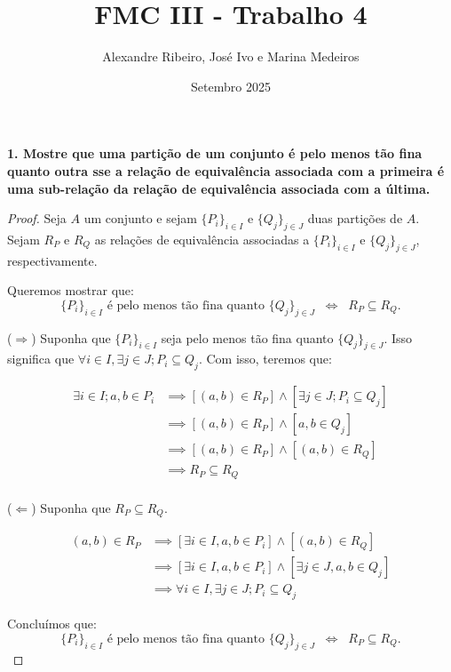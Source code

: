 \documentclass[12pt]{article}
\title{FMC III - Trabalho 4}
\author{Alexandre Ribeiro, José Ivo e Marina Medeiros}
\date{Setembro 2025}
\begin{document}
\maketitle

\textbf{1. Mostre que uma partição de um conjunto é pelo menos tão fina quanto outra sse a relação de equivalência associada com a primeira é uma sub-relação da relação de equivalência associada com a última.}

\begin{proof}
    Seja $A$ um conjunto e sejam $\{P_i\}_{i \in I}$ e $\{Q_j\}_{j \in J}$ duas partições de $A$.  
    Sejam $R_P$ e $R_Q$ as relações de equivalência associadas a $\{P_i\}_{i \in I}$ e $\{Q_j\}_{j \in J}$, respectivamente.

    \medskip
    Queremos mostrar que:
    \[
        \{P_i\}_{i \in I} \text{ é pelo menos tão fina quanto } \{Q_j\}_{j \in J}
        \;\;\Longleftrightarrow\;\;
        R_P \subseteq R_Q.
    \]

    \medskip
    ($\Rightarrow$) Suponha que $\{P_i\}_{i \in I}$ seja pelo menos tão fina quanto $\{Q_j\}_{j \in J}$. Isso significa que $\forall i \in I, \exists j \in J; P_i \subseteq Q_j$. Com isso, teremos que:
    
    \begin{align*}
        \exists i \in I; a, b \in P_i
        &\implies [(a, b) \in R_P] \land [\exists j \in J; P_i \subseteq Q_j] \\
        &\implies [(a, b) \in R_P] \land [a, b \in Q_j] \\
        &\implies [(a, b) \in R_P] \land [(a, b) \in R_Q] \\
        &\implies R_P \subseteq R_Q \\
    \end{align*}

    \medskip
    ($\Leftarrow$) Suponha que $R_P \subseteq R_Q$.  
    
    \begin{align*}
        (a,b) \in R_P
        &\implies [\exists i \in I, a, b \in P_i] \land [(a, b) \in R_Q] \\
        &\implies [\exists i \in I, a, b \in P_i] \land [\exists j \in J, a, b \in Q_j] \\
        &\implies \forall i \in I, \exists j \in J; P_i \subseteq Q_j
    \end{align*}




    \medskip
    Concluímos que:
    \[
        \{P_i\}_{i \in I} \text{ é pelo menos tão fina quanto } \{Q_j\}_{j \in J}
        \;\;\Longleftrightarrow\;\;
        R_P \subseteq R_Q.
    \]
\end{proof}
\end{document}
